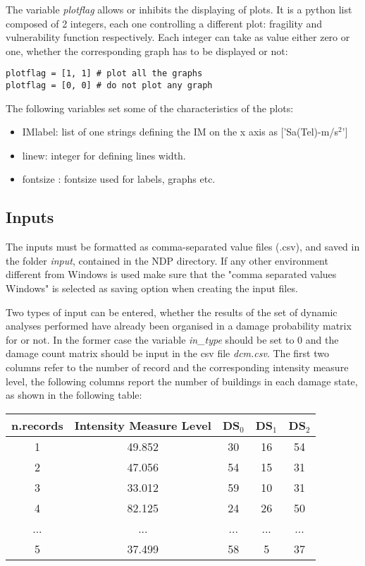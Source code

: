 The variable \textit{plotflag} allows or inhibits the displaying of plots. It is a python list composed of 2 integers, each one controlling a different plot: fragility and vulnerability function respectively. Each integer can take as value either zero or one, whether the corresponding graph has to be displayed or not:

\begin{Verbatim}[frame=single, commandchars=\\\{\}, samepage=true]
plotflag = [1, 1] # plot all the graphs
plotflag = [0, 0] # do not plot any graph
\end{Verbatim}

The following variables set some of the characteristics of the plots:
\begin{itemize}
\item IMlabel: list of one strings defining the IM on the x axis as ['Sa(Tel)-m/s$^{2}$']
\item linew: integer for defining lines width.
\item fontsize : fontsize used for labels, graphs etc.
\end{itemize}

\subsection{Inputs}
\label{subsec:NDMinputs}
The inputs must be formatted as comma-separated value files (.csv), and saved in the folder \textit{input}, contained in the NDP directory. If any other environment different from Windows is used make sure that the "comma separated values Windows" is selected as saving option when creating the input files.  

Two types of input can be entered, whether the results of the set of dynamic analyses performed have already been organised in a damage probability matrix for or not. In the former case the variable \textit{in\_type} should be set to 0 and the damage count matrix should be input in the csv file \textit{dcm.csv}. The first two columns refer to the number of record and the corresponding intensity measure level, the following columns report the number of buildings in each damage state, as shown in the following table:

\begin{table}[H]
\centering
\begin{tabular}{|c|c|c|c|c|} \hline
\textbf{n.records} & \textbf{Intensity Measure Level} & \textbf{DS$_0$} & \textbf{DS$_1$} & \textbf{DS$_2$} \\ \hline
1 & 49.852 &	30 &	16 &	54\\ \hline
2 & 47.056 &	54 &	15 &	31\\ \hline
3 & 33.012 &	59 &	10 &	31\\ \hline
4 & 82.125 &	24 &	26 &	50\\ \hline
... & ... & ... & ... & ... \\ \hline
5 & 37.499 &	58 &	5 &	37\\ \hline
\end{tabular}
\end{table}

